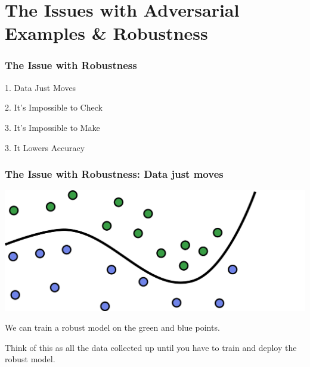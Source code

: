 \documentclass{beamer}
\begin{document}
\section{The Issues with Adversarial Examples \& Robustness}

\begin{frame}
    \frametitle{The Issue with Robustness}
    \begin{center}
        1. Data Just Moves

        \vspace*{30pt}
        2. It's Impossible to Check
        \vspace*{30pt}

        3. It's Impossible to Make
        \vspace*{30pt}

        3. It Lowers Accuracy
    \end{center}
\end{frame}


\begin{frame}
    \frametitle{The Issue with Robustness: Data just moves}
    \begin{center}
        \includegraphics[scale=1.2]{training_1.png}

        We can train a robust model on the green and blue points. 

        \vspace*{20pt}
        Think of this as all the data collected up until you have to train and deploy the robust model.
    \end{center}
\end{frame}
\end{document}

